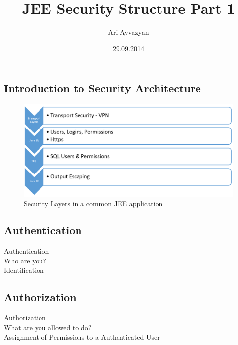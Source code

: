 \documentclass[12pt,a4paper,draft]{report}
\date{29.09.2014}
\author{Ari Ayvazyan}
\title{JEE Security Structure Part 1}
\begin{document}
\maketitle
\chapter{\MyTitle}


\section{Introduction to Security Architecture}
\begin{figure}[h]
\centering
\includegraphics[width=1\linewidth]{res/SecurityLayers}
\caption{Security Layers in a common JEE application}
\label{fig:SecurityLayers}
\end{figure}


\section{Authentication}
Authentication\\
Who are you?\\
Identification\\

\section{Authorization}
Authorization\\
What are you allowed to do?\\
Assignment of Permissions to a Authenticated User\\
\end{document}
